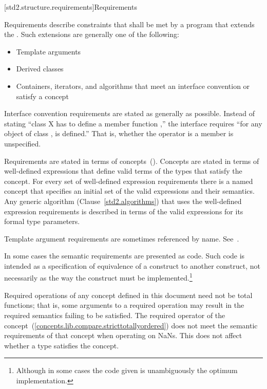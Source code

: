 [std2.structure.requirements]{Requirements}

\pnum
{}%
Requirements describe constraints that shall be met by a \Cpp program that
extends the .
Such extensions are generally one of the following:

\begin{itemize}
\item Template arguments
\item Derived classes
\item Containers, iterators, and algorithms that meet an interface convention
or satisfy a concept
\end{itemize}

\pnum
Interface convention requirements are stated as generally as possible. Instead
of stating ``class X has to define a member function ,'' the
interface requires ``for any object  of class ,  is
defined.'' That is, whether the operator is a member is unspecified.

\pnum
Requirements are stated in terms of concepts~().
Concepts are stated in terms of well-defined expressions that define valid terms of
the types that satisfy the concept. For every set of
well-defined expression requirements there is a named concept that
specifies an initial set of the valid expressions and their semantics. Any generic
algorithm (Clause~\ref{std2.algorithms}) that uses the well-defined expression requirements
is described in terms of the valid expressions for its formal type parameters.

\pnum
Template argument requirements are sometimes referenced by name.
See~.

\pnum
In some cases the semantic requirements are presented as \Cpp code.
Such code is intended as a
specification of equivalence of a construct to another construct, not
necessarily as the way the construct
must be implemented.\footnote{Although in some cases the code given is
unambiguously the optimum implementation.}

\pnum
Required operations of any concept defined in this document need not be
total functions; that is, some arguments to a required operation may
result in the required semantics failing to be satisfied. \enterexample
The required \tcode{<} operator of the 
concept~(\ref{concepts.lib.compare.stricttotallyordered}) does not meet the
semantic requirements of that concept when operating on NaNs.\exitexample
This does not affect whether a type satisfies the concept.

